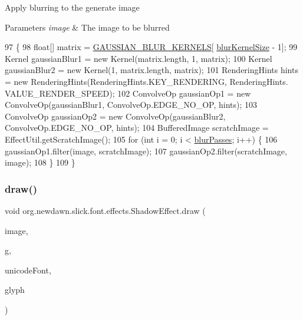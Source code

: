 Apply blurring to the generate image


\begin{DoxyParams}{Parameters}
{\em image} & The image to be blurred \\
\hline
\end{DoxyParams}

\begin{DoxyCode}
97                                            \{
98         \textcolor{keywordtype}{float}[] matrix = \mbox{\hyperlink{classorg_1_1newdawn_1_1slick_1_1font_1_1effects_1_1_shadow_effect_a7edefffb2d5466f8a726596a38ced771}{GAUSSIAN\_BLUR\_KERNELS}}[
      \mbox{\hyperlink{classorg_1_1newdawn_1_1slick_1_1font_1_1effects_1_1_shadow_effect_a9383b2ba78f68f6302bfd9e9cb5de0f0}{blurKernelSize}} - 1];
99         Kernel gaussianBlur1 = \textcolor{keyword}{new} Kernel(matrix.length, 1, matrix);
100         Kernel gaussianBlur2 = \textcolor{keyword}{new} Kernel(1, matrix.length, matrix);
101         RenderingHints hints = \textcolor{keyword}{new} RenderingHints(RenderingHints.KEY\_RENDERING, RenderingHints.
      VALUE\_RENDER\_SPEED);
102         ConvolveOp gaussianOp1 = \textcolor{keyword}{new} ConvolveOp(gaussianBlur1, ConvolveOp.EDGE\_NO\_OP, hints);
103         ConvolveOp gaussianOp2 = \textcolor{keyword}{new} ConvolveOp(gaussianBlur2, ConvolveOp.EDGE\_NO\_OP, hints);
104         BufferedImage scratchImage = EffectUtil.getScratchImage();
105         \textcolor{keywordflow}{for} (\textcolor{keywordtype}{int} i = 0; i < \mbox{\hyperlink{classorg_1_1newdawn_1_1slick_1_1font_1_1effects_1_1_shadow_effect_ae7079addc56e471f5c8747ffc8397a92}{blurPasses}}; i++) \{
106             gaussianOp1.filter(image, scratchImage);
107             gaussianOp2.filter(scratchImage, image);
108         \}
109     \}
\end{DoxyCode}
\mbox{\label{classorg_1_1newdawn_1_1slick_1_1font_1_1effects_1_1_shadow_effect_acd0d914b52c834f91becf289e7f6613e}} 
\subsubsection{\texorpdfstring{draw()}{draw()}}
{\footnotesize\ttfamily void org.\+newdawn.\+slick.\+font.\+effects.\+Shadow\+Effect.\+draw (\begin{DoxyParamCaption}\item[{Buffered\+Image}]{image,  }\item[{Graphics2D}]{g,  }\item[{\mbox{\hyperlink{classorg_1_1newdawn_1_1slick_1_1_unicode_font}{Unicode\+Font}}}]{unicode\+Font,  }\item[{\mbox{\hyperlink{classorg_1_1newdawn_1_1slick_1_1font_1_1_glyph}{Glyph}}}]{glyph }\end{DoxyParamCaption})\hspace{0.3cm}{\ttfamily [inline]}}

